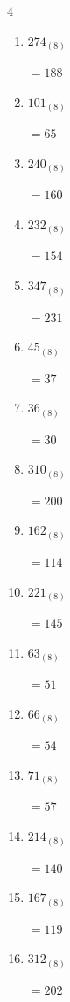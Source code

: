 \begin{multicols}{4}
\begin{enumerate}
        $=228$

  \item $274_{(8)}$

        $=188$

  \item $101_{(8)}$

        $=65$

  \item $240_{(8)}$

        $=160$

  \item $232_{(8)}$

        $=154$

  \item $347_{(8)}$

        $=231$

  \item $45_{(8)}$

        $=37$

  \item $36_{(8)}$

        $=30$

  \item $310_{(8)}$

        $=200$

  \item $162_{(8)}$

        $=114$

  \item $221_{(8)}$

        $=145$

  \item $63_{(8)}$

        $=51$

\columnbreak %

  \item $66_{(8)}$

        $=54$

  \item $71_{(8)}$

        $=57$

  \item $214_{(8)}$

        $=140$

  \item $167_{(8)}$

        $=119$

  \item $312_{(8)}$

        $=202$


\end{enumerate}
\end{multicols}
